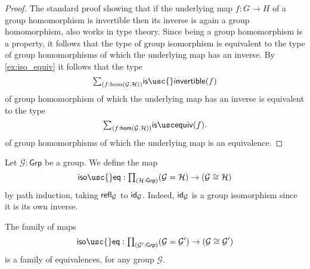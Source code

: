 \begin{proof}
The standard proof showing that if the underlying map $f:G\to H$ of a group homomorphism is invertible then its inverse is again a group homomorphism, also works in type theory. Since being a group homomorphism is a property, it follows that the type of group isomorphism is equivalent to the type of group homomorphisms of which the underlying map has an inverse. By \cref{ex:iso_equiv} it follows that the type 
\begin{equation*}
\sm{f:\mathrm{hom}(\mathcal{G},\mathcal{H})}\mathsf{is\usc{}invertible}(f)
\end{equation*}
of group homomorphism of which the underlying map has an inverse is equivalent to the type
\begin{equation*}
\sm{f:\mathsf{hom}(\mathcal{G},\mathcal{H})}\isequiv(f).
\end{equation*}
of group homomorphisms of which the underlying map is an equivalence.
\end{proof}

\begin{defn}
Let $\mathcal{G}:\mathsf{Grp}$ be a group. We define the map
\begin{equation*}
\mathsf{iso\usc{}eq} : \prd{\mathcal{H}:\mathsf{Grp}}(\mathcal{G}=\mathcal{H})\to (\mathcal{G}\cong\mathcal{H})
\end{equation*}
by path induction, taking $\refl{\mathcal{G}}$ to $\idfunc[\mathcal{G}]$. Indeed, $\idfunc[\mathcal{G}]$ is a group isomorphism since it is its own inverse.
\end{defn}

\begin{thm}
The family of maps
\begin{equation*}
\mathsf{iso\usc{}eq} : \prd{\mathcal{G}':\mathsf{Grp}}(\mathcal{G}=\mathcal{G}')\to (\mathcal{G}\cong\mathcal{G}')
\end{equation*}
is a family of equivalences, for any group $\mathcal{G}$.
\end{thm}

